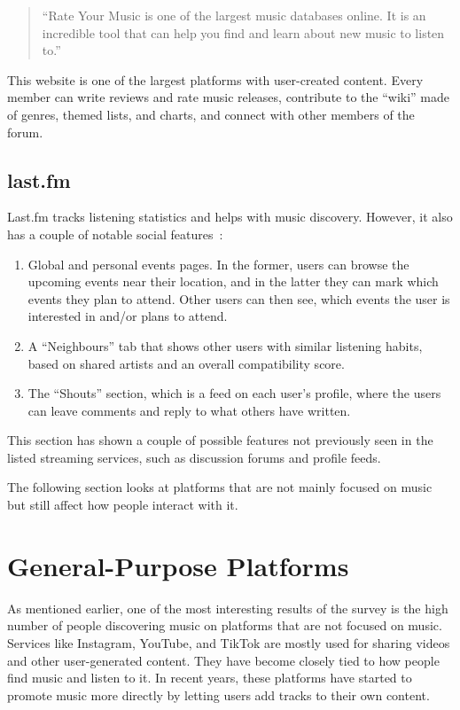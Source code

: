 \begin{quote}
    ``Rate Your Music is one of the largest music databases online. It is an incredible tool that
    can help you find and learn about new music to listen to.''~\parencite{ryt}
\end{quote}
This website is one of the largest platforms with user-created content.
Every member can write reviews and rate music releases,
contribute to the ``wiki'' made of genres, themed lists, and charts,
and connect with other members of the forum.

\subsection{last.fm}
Last.fm tracks listening statistics and helps with music discovery.
However, it also has a couple of notable social features~\parencite{lastfm_features}:
\begin{enumerate}
    \item Global and personal events pages.
    In the former, users can browse the upcoming events near their location, and in the latter
    they can mark which events they plan to attend.
    Other users can then see, which events the user is interested in and/or plans to attend.
    \item A ``Neighbours'' tab that shows other users with similar listening habits,
    based on shared artists and an overall compatibility score.
    \item The ``Shouts'' section, which is a feed on each user's profile, where the users can leave comments
    and reply to what others have written.
\end{enumerate}

This section has shown a couple of possible features not previously seen
in the listed streaming services, such as discussion forums and profile feeds.

The following section looks at platforms that are not mainly focused
on music but still affect how people interact with it.


\section{General-Purpose Platforms}
As mentioned earlier, one of the most interesting results of the survey is the high number of people
discovering music on platforms that are not focused on music.
Services like Instagram, YouTube, and TikTok are mostly used for sharing videos
and other user-generated content. They have become closely tied to how people find
music and listen to it.
In recent years, these platforms have started to promote music more directly by letting users
add tracks to their own content.

